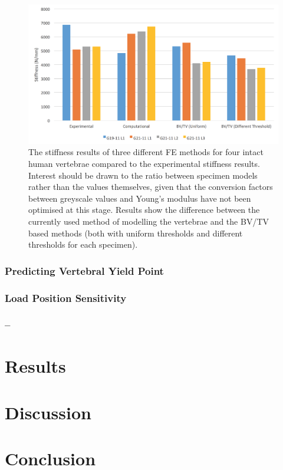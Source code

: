 \begin{figure}[h]
\centering
\includegraphics[width=6in]{Chapters/Chapter_HT_images/diffModellingMethods.png}
\caption{The stiffness results of three different FE methods for four intact human vertebrae compared to the experimental stiffness results.
	Interest should be drawn to the ratio between specimen models rather than the values themselves, given that the conversion factors between greyscale values and Young's modulus have not been optimised at this stage.
Results show the difference between the currently used method of modelling the vertebrae and the BV/TV based methods (both with uniform thresholds and different thresholds for each specimen).}
\label{fig:diffModellingMethods}
\end{figure}

\subsubsection{Predicting Vertebral Yield Point}\label{predYield}

\subsubsection{Load Position Sensitivity}


\subsubsection{--}

\section{Results}

\section{Discussion}

\section{Conclusion}







